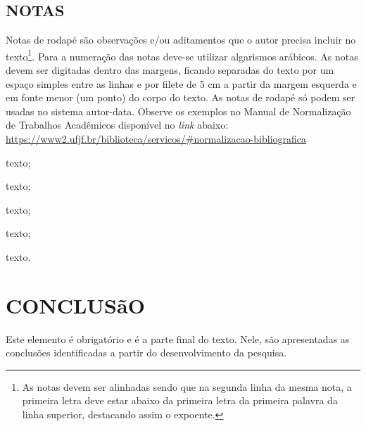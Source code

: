 \documentclass[
  oneside, %
  english,
  brazil
]{abntbibufjf}
\begin{document}
\section{NOTAS}

Notas de rodapé são observações e/ou aditamentos que o autor precisa incluir no texto\footnote[2]{
  As notas devem ser alinhadas sendo que na segunda linha da mesma nota, a primeira letra deve estar abaixo da primeira letra da primeira palavra da linha superior, destacando assim o expoente.
}.
Para a numeração das notas deve-se utilizar algarismos arábicos.
As notas devem ser digitadas dentro das margens, ficando separadas do texto por um espaço simples entre as linhas e por filete de 5 cm a partir da margem esquerda e em fonte menor (um ponto) do corpo do texto.
As notas de rodapé só podem ser usadas no sistema autor-data.
Observe os exemplos no Manual de Normalização de Trabalhos Acadêmicos disponível no \textit{link} abaixo:\\
\url{https://www2.ufjf.br/biblioteca/servicos/#normalizacao-bibliografica}



\begin{alineas}
  \item texto;
  \item texto;
  \begin{subalineas}
    \item texto;
    \item texto;
  \end{subalineas}
  \item texto.
\end{alineas}



\chapter{CONCLUSãO}

Este elemento é obrigatório e é a parte final do texto.  Nele, são apresentadas as conclusões identificadas a partir do desenvolvimento da pesquisa.

\end{document}
